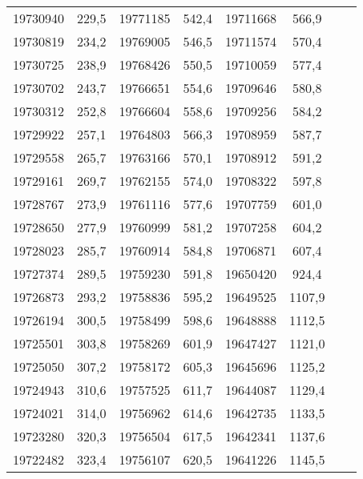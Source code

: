 \documentclass[11pt]{article}
\begin{document}
{{\begin{tabular}{|c|c|cc|c|c|cc}
            \hline 
            19730940 & 229,5 & \multicolumn{1}{c|}{19771185} & 542,4 & 19711668 & 566,9 &  & \tabularnewline
            \cline{1-6} 
            19730819 & 234,2 & \multicolumn{1}{c|}{19769005} & 546,5 & 19711574 & 570,4 &  & \tabularnewline
            \cline{1-6} 
            19730725 & 238,9 & \multicolumn{1}{c|}{19768426} & 550,5 & 19710059 & 577,4 &  & \tabularnewline
            \cline{1-6} 
            19730702 & 243,7 & \multicolumn{1}{c|}{19766651} & 554,6 & 19709646 & 580,8 &  & \tabularnewline
            \cline{1-6} 
            19730312 & 252,8 & \multicolumn{1}{c|}{19766604} & 558,6 & 19709256 & 584,2 &  & \tabularnewline
            \cline{1-6} 
            19729922 & 257,1 & \multicolumn{1}{c|}{19764803} & 566,3 & 19708959 & 587,7 &  & \tabularnewline
            \cline{1-6} 
            19729558 & 265,7 & \multicolumn{1}{c|}{19763166} & 570,1 & 19708912 & 591,2 &  & \tabularnewline
            \cline{1-6} 
            19729161 & 269,7 & \multicolumn{1}{c|}{19762155} & 574,0 & 19708322 & 597,8 &  & \tabularnewline
            \cline{1-6} 
            19728767 & 273,9 & \multicolumn{1}{c|}{19761116} & 577,6 & 19707759 & 601,0 &  & \tabularnewline
            \cline{1-6} 
            19728650 & 277,9 & \multicolumn{1}{c|}{19760999} & 581,2 & 19707258 & 604,2 &  & \tabularnewline
            \cline{1-6} 
            19728023 & 285,7 & \multicolumn{1}{c|}{19760914} & 584,8 & 19706871 & 607,4 &  & \tabularnewline
            \cline{1-6} 
            19727374 & 289,5 & \multicolumn{1}{c|}{19759230} & 591,8 & 19650420 & 924,4 &  & \tabularnewline
            \cline{1-6} 
            19726873 & 293,2 & \multicolumn{1}{c|}{19758836} & 595,2 & 19649525 & 1107,9 &  & \tabularnewline
            \cline{1-6} 
            19726194 & 300,5 & \multicolumn{1}{c|}{19758499} & 598,6 & 19648888 & 1112,5 &  & \tabularnewline
            \cline{1-6} 
            19725501 & 303,8 & \multicolumn{1}{c|}{19758269} & 601,9 & 19647427 & 1121,0 &  & \tabularnewline
            \cline{1-6} 
            19725050 & 307,2 & \multicolumn{1}{c|}{19758172} & 605,3 & 19645696 & 1125,2 &  & \tabularnewline
            \cline{1-6} 
            19724943 & 310,6 & \multicolumn{1}{c|}{19757525} & 611,7 & 19644087 & 1129,4 &  & \tabularnewline
            \cline{1-6} 
            19724021 & 314,0 & \multicolumn{1}{c|}{19756962} & 614,6 & 19642735 & 1133,5 &  & \tabularnewline
            \cline{1-6} 
            19723280 & 320,3 & \multicolumn{1}{c|}{19756504} & 617,5 & 19642341 & 1137,6 &  & \tabularnewline
            \cline{1-6} 
            19722482 & 323,4 & \multicolumn{1}{c|}{19756107} & 620,5 & 19641226 & 1145,5 &  & \tabularnewline

\end{tabular}}}
\end{document}
